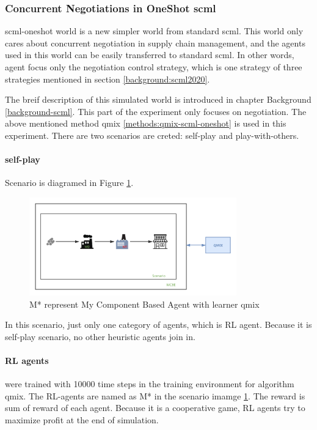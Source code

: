 \subsubsection{Concurrent Negotiations in OneShot \gls{scml}}

scml-oneshot world is a new simpler world from standard scml. This world only cares about concurrent negotiation in supply chain management, and the agents used in this world can be easily transferred to standard scml. In other words, agent focus only the negotiation control strategy, which is one strategy of three strategies mentioned in section \ref{background:scml2020}.
 
The breif description of this simulated world is introduced in chapter Background \ref{background-scml}. This part of the experiment only focuses on negotiation. The above mentioned method qmix \ref{methods:qmix-scml-oneshot} is used in this experiment. There are two scenarios are creted: self-play and play-with-others.

\paragraph{self-play}
Scenario is diagramed in Figure \ref{fig:scenario-oneshot-scml-self-play}.
\begin{figure}[htbp]
\centering
\includegraphics[width=0.80\textwidth]{./images/scenario-oneshot-scml-self-play.png}
\caption{M* represent My Component Based Agent with learner \gls{qmix}}
\label{fig:scenario-oneshot-scml-self-play}
\end{figure}

In this scenario, just only one category of agents, which is RL agent. Because it is self-play scenario, no other heuristic agents join in.
\paragraph{RL agents} were trained with 10000 time steps in the training environment for algorithm qmix. The RL-agents are named as M* in the scenario imamge \ref{fig:scenario-oneshot-scml-self-play}. The reward is sum of reward of each agent. Because it is a cooperative game, RL agents try to maximize profit at the end of simulation.

